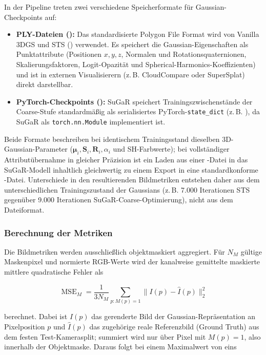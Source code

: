 In der Pipeline treten zwei verschiedene Speicherformate für Gaussian-Checkpoints
auf:
\begin{itemize}
  \item \textbf{PLY-Dateien ():} Das standardisierte Polygon File
        Format wird von Vanilla 3DGS und STS () verwendet. Es
        speichert die Gaussian-Eigenschaften als Punktattribute (Positionen $x,y,z$,
        Normalen und Rotationsquaternionen, Skalierungsfaktoren, Logit-Opazität und
        Spherical-Harmonics-Koeffizienten) und ist in externen Visualisierern (z.\,B.
        CloudCompare oder SuperSplat) direkt darstellbar.
  \item \textbf{PyTorch-Checkpoints ():} SuGaR speichert
        Trainingszwischenstände der Coarse-Stufe standardmäßig als serialisiertes
        PyTorch-\texttt{state\_dict} (z.\,B. ), da SuGaR als
        \texttt{torch.nn.Module} implementiert ist.
\end{itemize}

Beide Formate beschreiben bei identischem Trainingsstand dieselben
3D-Gaussian-Parameter ($\boldsymbol{\mu}_i, \mathbf{S}_i, \mathbf{R}_i,
\alpha_i$ und SH-Farbwerte); bei vollständiger Attributübernahme in gleicher
Präzision ist ein Laden aus einer -Datei in das SuGaR-Modell
inhaltlich gleichwertig zu einem Export in eine standardkonforme
-Datei. Unterschiede in den resultierenden Bildmetriken entstehen
daher aus dem unterschiedlichen Trainingszustand der Gaussians (z.\,B. 7.000
Iterationen STS gegenüber 9.000 Iterationen SuGaR-Coarse-Optimierung), nicht
aus dem Dateiformat.

\subsubsection*{Berechnung der Metriken}

Die Bildmetriken werden ausschließlich objektmaskiert aggregiert. Für $N_M$ gültige
Maskenpixel und normierte RGB-Werte wird der kanalweise gemittelte maskierte
mittlere quadratische Fehler als

\begin{equation}
	\operatorname{MSE}_M=
	\frac{1}{3N_M}\sum_{p:M(p)=1}\lVert I(p)-\hat I(p)\rVert_2^2
	\label{eq:masked-mse}
\end{equation}

berechnet. Dabei ist $I(p)$ das gerenderte Bild der Gaussian-Repräsentation an
Pixelposition $p$ und $\hat I(p)$ das zugehörige reale Referenzbild (Ground
Truth) aus dem festen Test-Kamerasplit; summiert wird nur über Pixel mit
$M(p)=1$, also innerhalb der Objektmaske. Daraus folgt bei einem Maximalwert
von eins

